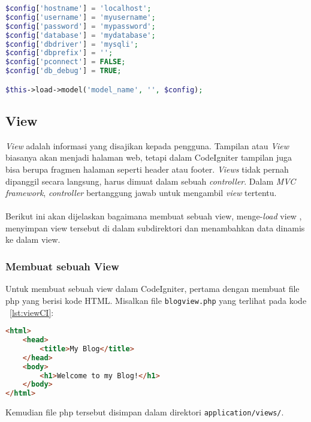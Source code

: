 \begin{lstlisting}[style=customphp, language=PHP, basicstyle=\ttfamily, frame=single, columns=fullflexible, keepspaces=true, breaklines=true, showstringspaces=false, label={lst:databaseCI}, caption=Struktur database pada CodeIgniter.]
$config['hostname'] = 'localhost';
$config['username'] = 'myusername';
$config['password'] = 'mypassword';
$config['database'] = 'mydatabase';
$config['dbdriver'] = 'mysqli';
$config['dbprefix'] = '';
$config['pconnect'] = FALSE;
$config['db_debug'] = TRUE;

$this->load->model('model_name', '', $config);
\end{lstlisting}

\subsection{View}
\label{s:viewCI}
\par \textit{View } adalah informasi yang disajikan kepada pengguna. Tampilan atau \textit{View} biasanya akan menjadi halaman web, tetapi dalam CodeIgniter tampilan juga bisa berupa fragmen halaman seperti header atau footer. \textit{Views} tidak pernah dipanggil secara langsung, harus dimuat dalam sebuah \textit{controller}. Dalam \textit{MVC framework}, \textit{controller} bertanggung jawab untuk mengambil \textit{view} tertentu. \\ \\
Berikut ini akan dijelaskan bagaimana membuat sebuah view, menge-\textit{load} view , menyimpan view tersebut di dalam subdirektori dan menambahkan data dinamis ke dalam view.

\subsubsection{Membuat sebuah View}
\label{ss:sebuahViewCI}
Untuk membuat sebuah view dalam CodeIgniter, pertama dengan membuat file php yang berisi kode HTML. Misalkan file \verb|blogview.php| yang terlihat pada kode ~\ref{lst:viewCI}:
\begin{lstlisting}[style=customhtml, language=HTML, basicstyle=\ttfamily, frame=single, columns=fullflexible, keepspaces=true, breaklines=true, showstringspaces=false, label={lst:viewCI}, caption=Contoh view pada CodeIgniter.] 
<html>
	<head>
		<title>My Blog</title>
	</head>
	<body>
		<h1>Welcome to my Blog!</h1>
	</body>
</html>
\end{lstlisting}

\noindent Kemudian file php tersebut disimpan dalam direktori \texttt{application/views/}.

